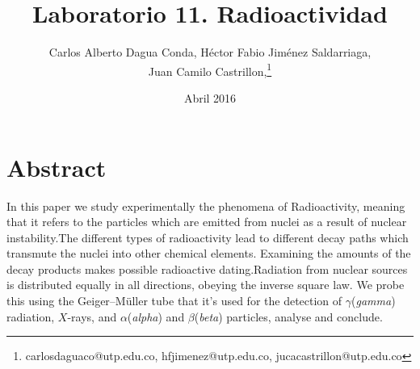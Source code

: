 \documentclass{article}									%
\title{Laboratorio 11. Radioactividad}
\author{Carlos Alberto Dagua Conda, Héctor Fabio Jiménez Saldarriaga, \\Juan Camilo Castrillon,\thanks{carlosdaguaco@utp.edu.co, hfjimenez@utp.edu.co, jucacastrillon@utp.edu.co} }
\date{Abril 2016}
\begin{document}
\maketitle

\section{Abstract}
In this paper we study experimentally the phenomena of Radioactivity, meaning that it refers to the particles which are emitted from nuclei as a result of nuclear instability.The different types of radioactivity lead to different decay paths which transmute the nuclei into other chemical elements. Examining the amounts of the decay products makes possible radioactive dating.Radiation from nuclear sources is distributed equally in all directions, obeying the inverse square law. We probe this using the Geiger–Müller tube that it's used for the detection of $\gamma$(\textit{gamma}) radiation, $X$-rays, and $\alpha$(\textit{alpha}) and $\beta$(\textit{beta}) particles, analyse and conclude.
\end{document}
